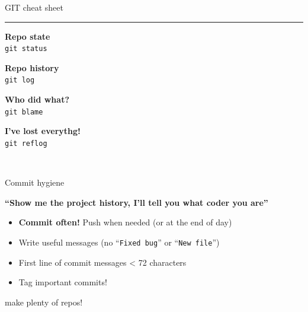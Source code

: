 \documentclass[compress]{beamer}
\begin{document}
\begin{frame}{GIT cheat sheet}
\begin{multicols}{2}
    \rule{\columnwidth}{0.2pt}

    \begin{multicols}{2}
    {\bf Repo state}\\
    \texttt{git status}\par

    {\bf Repo history}\\
    \texttt{git log}\par

    {\bf Who did what?}\\
    \texttt{git blame}\par

    {\bf I've lost everythg!}\\
    \texttt{git reflog}\par


    \end{multicols}

    ~\\

    \end{multicols}

\end{frame}

\begin{frame}{Commit hygiene}
    \centering

    {\bf ``Show me the project history, I'll tell you what coder you are''}

    \begin{itemize}
        \item<1> {\bf Commit often!} Push when needed (or at the end of day)
        \item<2> Write useful messages (no ``\texttt{Fixed bug}'' or ``\texttt{New
            file}'')
        \item<2> First line of commit messages < 72 characters
        \item<3> Tag important commits!
    \end{itemize}

\end{frame}

\begin{frame}{}
    \centering

    make plenty of repos!
\end{frame}
\end{document}
